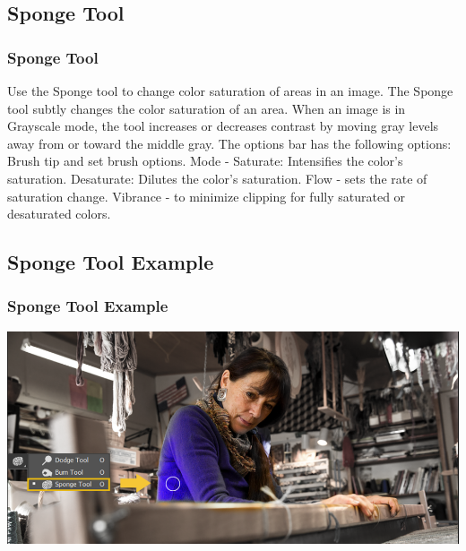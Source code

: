 \documentclass{beamer}
\begin{document}
			\subsection{Sponge Tool}		
				\begin{frame}
					\frametitle{Sponge Tool}
					\begin{outline}
						\1 Use the Sponge tool to change color saturation of areas in an image.
						\1 The Sponge tool subtly changes the color saturation of an area.
						\1 When an image is in Grayscale mode, the tool increases or decreases contrast by moving gray levels away from or toward the middle gray.
						\1 The options bar has the following options:
						\2 Brush tip and set brush options.
						\2 Mode - 
						\3 Saturate: Intensifies the color's saturation.
						\3 Desaturate:  Dilutes the color's saturation.
						\2 Flow - sets the rate of saturation change.
						\2 Vibrance - to minimize clipping for fully saturated or desaturated colors.
					\end{outline}
				\end{frame}
			
			\subsection{Sponge Tool Example}		
	\begin{frame}
		\frametitle{Sponge Tool Example}
		\includegraphics[width=1.0\textwidth]{images/sponge tool example.png}
	\end{frame}

		\section{}
\end{document}
